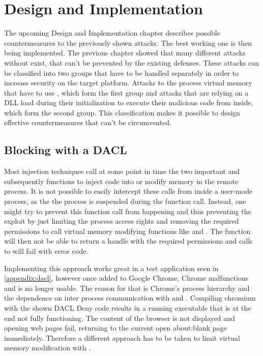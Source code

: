\section{Design and Implementation}
The upcoming Design and Implementation chapter describes possible countermeasures to the previously shown attacks. The best working one is then being implemented.
\label{sec:implementation}
The previous chapter showed that many different attacks without exist, that can't be prevented by the existing defenses. These attacks can be classified into two groups that have to be handled separately in order to increase security on the target platform. Attacks to the process virtual memory that have to use , which form the first group and attacks that are relying on a DLL load during their initialization to execute their malicious code from inside, which form the second group. This classification makes it possible to design effective countermeasures that can't be circumvented. 

\subsection{Blocking  with a DACL}
\label{sec:implementation_dacl}
Most injection techniques call at some point in time the two important  and subsequently  functions to inject code into or modify memory in the remote process. It is not possible to easily intercept these calls from inside a user-mode process, as the the process is suspended during the  function call. Instead, one might try to prevent this function call from happening and thus preventing the exploit by just limiting the process access rights and removing the required permissions to call virtual memory modifying functions like  and . The  function will then not be able to return a handle with the required permissions and calls to  will fail with  error code.

Implementing this approach works great in a test application seen in \ref{appendix:dacl}, however once added to Google Chrome, Chrome malfunctions and is no longer usable. The reason for that is Chrome's process hierarchy and the dependence on inter process communication with  and . Compiling chromium with the shown DACL Deny code results in a running executable that is at the end not fully functioning. The content of the browser is not displayed and opening web pages fail, returning to the current open about:blank page immediately. Therefore a different approach has to be taken to limit virtual memory modification with .

